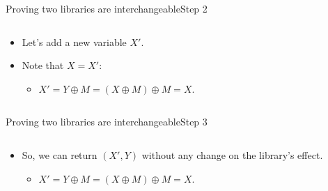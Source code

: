 \documentclass[aspectratio=169, lualatex, handout]{beamer}
\begin{document}
\begin{frame}{Proving two libraries are interchangeable}{Step 2}
	\begin{columns}[c]
		\begin{column}{0.5\textwidth}
			\begin{itemize}[<+->]
				\item Let's add a new variable $X'$.
				\item Note that $X = X'$:
				      \begin{itemize}
					      \item $X' = Y \oplus M = (X \oplus M) \oplus M = X$.
				      \end{itemize}
			\end{itemize}
		\end{column}
		\begin{column}{0.5\textwidth}
			\begin{center}
			\end{center}
		\end{column}
	\end{columns}
\end{frame}

\begin{frame}{Proving two libraries are interchangeable}{Step 3}
	\begin{columns}[c]
		\begin{column}{0.5\textwidth}
			\begin{itemize}[<+->]
				\item So, we can return $(X', Y)$ without any change on the library's effect.
				      \begin{itemize}
					      \item $X' = Y \oplus M = (X \oplus M) \oplus M = X$.
				      \end{itemize}
			\end{itemize}
		\end{column}
		\begin{column}{0.5\textwidth}
			\begin{center}
			\end{center}
		\end{column}
	\end{columns}
\end{frame}
\end{document}
